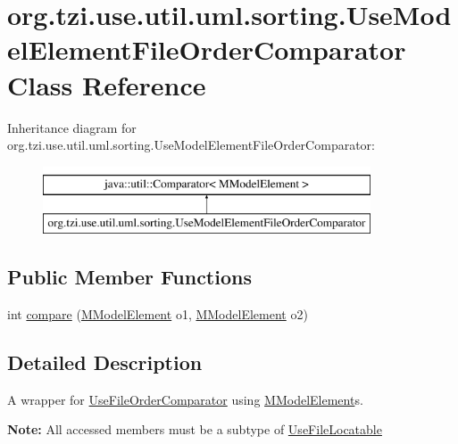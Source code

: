 \hypertarget{classorg_1_1tzi_1_1use_1_1util_1_1uml_1_1sorting_1_1_use_model_element_file_order_comparator}{\section{org.\-tzi.\-use.\-util.\-uml.\-sorting.\-Use\-Model\-Element\-File\-Order\-Comparator Class Reference}
\label{classorg_1_1tzi_1_1use_1_1util_1_1uml_1_1sorting_1_1_use_model_element_file_order_comparator}
}
Inheritance diagram for org.\-tzi.\-use.\-util.\-uml.\-sorting.\-Use\-Model\-Element\-File\-Order\-Comparator\-:\begin{figure}[H]
\begin{center}
\leavevmode
\includegraphics[height=2.000000cm]{classorg_1_1tzi_1_1use_1_1util_1_1uml_1_1sorting_1_1_use_model_element_file_order_comparator}
\end{center}
\end{figure}
\subsection*{Public Member Functions}
\begin{DoxyCompactItemize}
\item 
int \hyperlink{classorg_1_1tzi_1_1use_1_1util_1_1uml_1_1sorting_1_1_use_model_element_file_order_comparator_ae49fecabc78f75801a1c6054486f56b6}{compare} (\hyperlink{interfaceorg_1_1tzi_1_1use_1_1uml_1_1mm_1_1_m_model_element}{M\-Model\-Element} o1, \hyperlink{interfaceorg_1_1tzi_1_1use_1_1uml_1_1mm_1_1_m_model_element}{M\-Model\-Element} o2)
\end{DoxyCompactItemize}


\subsection{Detailed Description}
A wrapper for \hyperlink{classorg_1_1tzi_1_1use_1_1util_1_1uml_1_1sorting_1_1_use_file_order_comparator}{Use\-File\-Order\-Comparator} using \hyperlink{}{M\-Model\-Element}s. 

{\bfseries Note\-:} All accessed members must be a subtype of \hyperlink{}{Use\-File\-Locatable}

